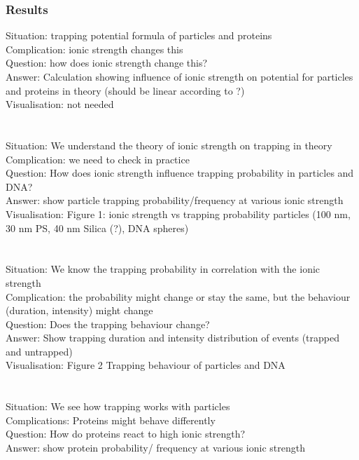 \subsubsection{Results}
    Situation: trapping potential formula of particles and proteins\\
	Complication: ionic strength changes this\\
	Question: how does ionic strength change this?\\
	Answer: Calculation showing influence of ionic strength on potential for particles and proteins in theory (should be linear according to \cite{cametti2011Dielectric}?)\\
	Visualisation: not needed\\
    \\\\
    Situation: We understand the theory of ionic strength on trapping in theory\\
	Complication: we need to check in practice\\
	Question: How does ionic strength influence trapping probability in particles and DNA?\\
	Answer: show particle trapping probability/frequency at various ionic strength \\
	Visualisation: Figure 1: ionic strength vs trapping probability particles (100 nm, 30 nm PS, 40 nm Silica (?), DNA spheres)\\
    \\\\
    Situation: We know the trapping probability in correlation with the ionic strength\\
	Complication: the probability might change or stay the same, but the behaviour (duration, intensity) might change\\
	Question: Does the trapping behaviour change?\\
	Answer: Show trapping duration and intensity distribution of events (trapped and untrapped)\\
	Visualisation: Figure 2 Trapping behaviour of particles and DNA\\
    \\\\
    Situation: We see how trapping works with particles\\
    Complications: Proteins might behave differently\\
	Question: How do proteins react to high ionic strength?\\
	Answer: show protein probability/ frequency at various ionic strength \\

